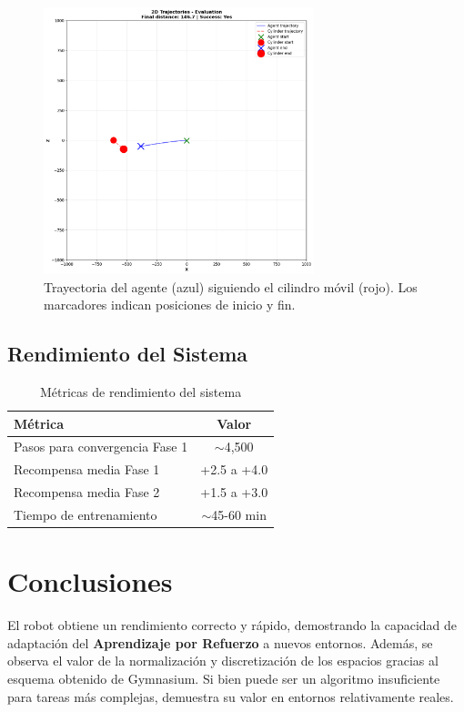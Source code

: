 \documentclass[12pt,a4paper]{article}
\begin{document}
\begin{figure}[H]
    \centering
    \includegraphics[width=0.7\textwidth]{logs/evaluation_trajectory.png}
    \caption{Trayectoria del agente (azul) siguiendo el cilindro móvil (rojo). Los marcadores indican posiciones de inicio y fin.}
    \label{fig:trajectories}
\end{figure}

\subsection{Rendimiento del Sistema}

\begin{table}[H]
\centering
\begin{tabular}{@{}lc@{}}
\toprule
\textbf{Métrica} & \textbf{Valor} \\ \midrule
Pasos para convergencia Fase 1 & $\sim$4,500 \\
Recompensa media Fase 1 & +2.5 a +4.0 \\
Recompensa media Fase 2 & +1.5 a +3.0 \\
Tiempo de entrenamiento & $\sim$45-60 min \\ \bottomrule
\end{tabular}
\caption{Métricas de rendimiento del sistema}
\end{table}

\section{Conclusiones}

El robot obtiene un rendimiento correcto y rápido, demostrando la capacidad de adaptación del \textbf{Aprendizaje por Refuerzo} a nuevos entornos. Además, se observa el valor de la normalización y discretización de los espacios gracias al esquema obtenido de Gymnasium. Si bien puede ser un algoritmo insuficiente para tareas más complejas, demuestra su valor en entornos relativamente reales.
\end{document}
